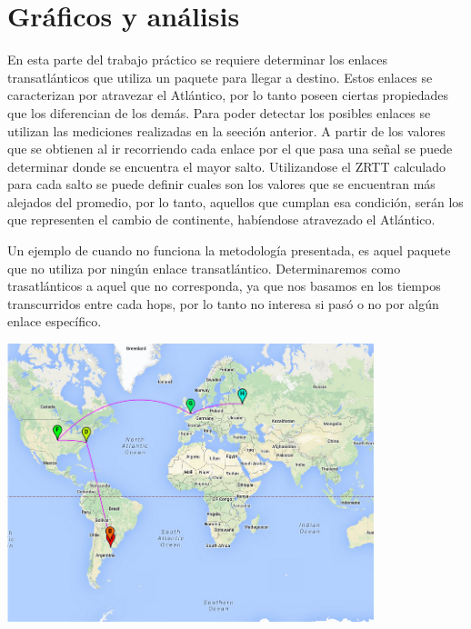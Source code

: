 \section{Gráficos y análisis}

En esta parte del trabajo práctico se requiere determinar los enlaces transatlánticos que utiliza un paquete para llegar a destino. Estos enlaces se caracterizan por atravezar el Atlántico, por lo tanto poseen ciertas propiedades que los diferencian de los demás. Para poder detectar los posibles enlaces se utilizan las mediciones realizadas en la seeción anterior. A partir de los valores que se obtienen al ir recorriendo cada enlace por el que pasa una señal se puede determinar donde se encuentra el mayor salto. 
Utilizandose el ZRTT calculado para cada salto se puede definir cuales son los valores que se encuentran más alejados del promedio, por lo tanto, aquellos que cumplan esa condición, serán los que representen el cambio de continente, habíendose atravezado el Atlántico. 

Un ejemplo de cuando no funciona la metodología presentada, es aquel paquete que no utiliza por ningún enlace transatlántico. Determinaremos como trasatlánticos a aquel que no corresponda, ya que nos basamos en los tiempos transcurridos entre cada hops, por lo tanto no interesa si pasó o no por algún enlace específico.


\centerline{\includegraphics[width=0.8\textwidth]{mapas/rusia.png}}

